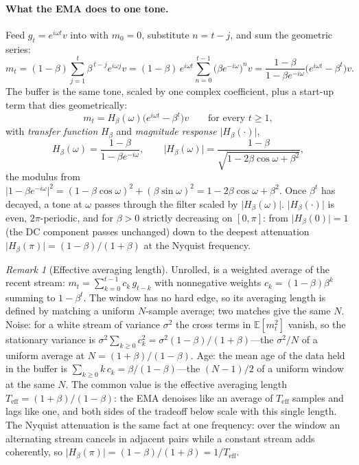 \documentclass[11pt,a4paper]{article}
\theoremstyle{remark}
\newtheorem{remark}{Remark}
\newcommand{\Hmag}[1]{\lvert H_\beta(#1)\rvert}
\newcommand{\Teff}{T_{\mathrm{eff}}}
\begin{document}
\paragraph{What the EMA does to one tone.} Feed $g_t=e^{i\omega t}v$ into  with $m_0=0$, substitute $n=t-j$, and sum the geometric series:
\[
m_t=(1-\beta)\sum_{j=1}^{t}\beta^{\,t-j}e^{i\omega j}v
=(1-\beta)\,e^{i\omega t}\sum_{n=0}^{t-1}\bigl(\beta e^{-i\omega}\bigr)^{n}v
=\frac{1-\beta}{1-\beta e^{-i\omega}}\bigl(e^{i\omega t}-\beta^{t}\bigr)v .
\]
The buffer is the same tone, scaled by one complex coefficient, plus a start-up term that dies geometrically:
\begin{equation}
\label{eq:pertone}
m_t=H_\beta(\omega)\bigl(e^{i\omega t}-\beta^t\bigr)v\qquad\text{for every }t\ge1,
\end{equation}
with \emph{transfer function} $H_\beta$ and \emph{magnitude response} $\Hmag{\cdot}$,
\begin{equation}
\label{eq:transfer}
H_\beta(\omega)=\frac{1-\beta}{1-\beta e^{-i\omega}},\qquad
\Hmag{\omega}=\frac{1-\beta}{\sqrt{1-2\beta\cos\omega+\beta^2}},
\end{equation}
the modulus from $\lvert1-\beta e^{-i\omega}\rvert^{2}=(1-\beta\cos\omega)^{2}+(\beta\sin\omega)^{2}=1-2\beta\cos\omega+\beta^{2}$.
Once $\beta^t$ has decayed, a tone at $\omega$ passes through the filter scaled by $\Hmag{\omega}$.
$\Hmag{\cdot}$ is even, $2\pi$-periodic, and for $\beta>0$ strictly decreasing on $[0,\pi]$: from $\Hmag{0}=1$ (the DC component passes unchanged) down to the deepest attenuation $\Hmag{\pi}=(1-\beta)/(1+\beta)$ at the Nyquist frequency.

\begin{remark}[Effective averaging length]
\label{rem:teff}
Unrolled,  is a weighted average of the recent stream: $m_t=\sum_{k=0}^{t-1}c_k\,g_{t-k}$ with nonnegative weights $c_k=(1-\beta)\beta^k$ summing to $1-\beta^t$.
The window has no hard edge, so its averaging length is defined by matching a uniform $N$-sample average; two matches give the same $N$.
Noise: for a white stream of variance $\sigma^2$ the cross terms in $\mathbb{E}[m_t^2]$ vanish, so the stationary variance is $\sigma^2\sum_{k\ge0}c_k^2=\sigma^2(1-\beta)/(1+\beta)$---the $\sigma^2/N$ of a uniform average at $N=(1+\beta)/(1-\beta)$.
Age: the mean age of the data held in the buffer is $\sum_{k\ge0}k\,c_k=\beta/(1-\beta)$---the $(N-1)/2$ of a uniform window at the same $N$.
The common value is the effective averaging length $\Teff=(1+\beta)/(1-\beta)$: the EMA denoises like an average of $\Teff$ samples and lags like one, and both sides of the tradeoff below scale with this single length.
The Nyquist attenuation is the same fact at one frequency: over the window an alternating stream cancels in adjacent pairs while a constant stream adds coherently, so $\Hmag{\pi}=(1-\beta)/(1+\beta)=1/\Teff$.
\end{remark}
\end{document}
